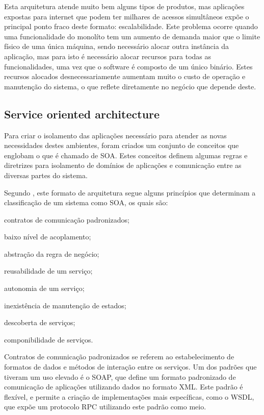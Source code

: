 Esta arquitetura atende muito bem alguns tipos de produtos, mas aplicações
expostas para internet que podem ter milhares de acessos simultâneos expõe o
principal ponto fraco deste formato: escalabilidade. Este problema ocorre
quando uma funcionalidade do monolíto tem um aumento de demanda maior que o
limite físico de uma única máquina, sendo necessário alocar outra instância
da aplicação, mas para isto é necessário alocar recursos para todas as
funcionalidades, uma vez que o software é composto de um único binário. Estes
recursos alocados desnecessariamente aumentam muito o custo de operação e
manutenção do sistema, o que reflete diretamente no negócio que depende deste.

\subsection{Service oriented architecture}

Para criar o isolamento das aplicações necessário para atender as novas
necessidades destes ambientes, foram criados um conjunto de conceitos
que englobam o que é chamado de \ac{SOA}. Estes conceitos definem algumas
regras e diretrizes para isolamento de domínios de aplicações e comunicação
entre as diversas partes do sistema.

Segundo , este formato de arquitetura segue alguns
princípios que determinam a classificação de um sistema como \ac{SOA},
os quais são:

\begin{alineas}
  \item contratos de comunicação padronizados;
  \item baixo nível de acoplamento;
  \item abstração da regra de negócio;
  \item reusabilidade de um serviço;
  \item autonomia de um serviço;
  \item inexistência de manutenção de estados;
  \item descoberta de serviços;
  \item componibilidade de serviços.
\end{alineas}

Contratos de comunicação padronizados se referem ao estabelecimento de
formatos de dados e métodos de interação entre os serviços. Um dos padrões
que tiveram um uso elevado é o \ac{SOAP}, que define um formato padronizado
de comunicação de aplicações utilizando dados no formato \ac{XML}. Este padrão
é flexível, e permite a criação de implementações mais específicas, como o
\ac{WSDL}, que expõe um protocolo \ac{RPC} utilizando este padrão como
meio.

